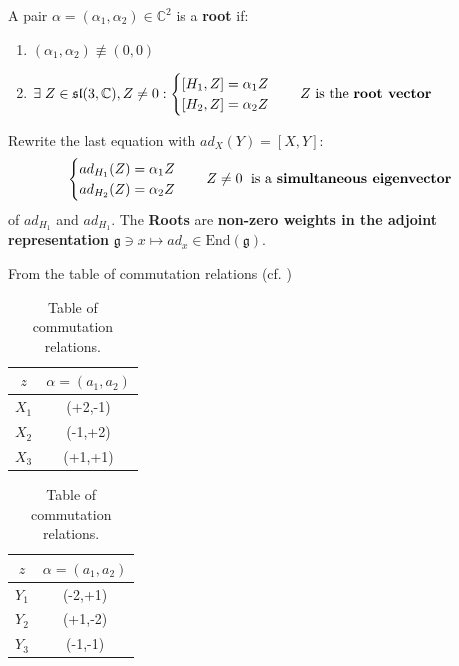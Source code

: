 \documentclass[../main.tex]{subfiles}
\begin{document}
\begin{definition}[Roots]
A pair $\alpha=(\alpha_1,\alpha_2)\in\mathbb{C}^2$ is a \textbf{root} if:
\begin{enumerate}
    \item $(\alpha_1,\alpha_2)\nequiv(0,0)$
    \item $\exists\; Z\in\mathfrak{sl}(3,\mathbb{C}), Z\neq0: \begin{cases}
    [H_1,Z]=\alpha_1 Z\\
    [H_2,Z]=\alpha_2 Z
    \end{cases}
    \quad Z \text{ is the \textbf{root vector}}$
\end{enumerate}
\end{definition}
\begin{kaobox}[frametitle=Remark]
Rewrite the last equation with $ad_X(Y)=[X,Y]$:
\[
\begin{cases}
ad_{H_1}(Z)=\alpha_1 Z\\
ad_{H_2}(Z)=\alpha_2 Z
\end{cases}
\quad Z\neq 0 \;\text{ is a \textbf{simultaneous eigenvector}}
\]
of $ad_{H_1}$ and $ad_{H_1}$. The \textbf{Roots} are \textbf{non-zero weights in the adjoint representation} $\mathfrak{g}\ni x\mapsto ad_x\in\textrm{End}(\mathfrak{g})$.
\end{kaobox}
From the table of commutation relations (cf. )
\begin{table}[h!]
    \centering
    \begin{tabular}{c|c}
       \hline
       $z$  & $\alpha=(a_1,a_2)$\\
       \hline\hline
       $X_1$ & (+2,-1)\\
       $X_2$ & (-1,+2)\\
       $X_3$ & (+1,+1)
    \end{tabular}
    \qquad 
    \begin{tabular}{c|c}
       \hline
       $z$  & $\alpha=(a_1,a_2)$\\
       \hline\hline
       $Y_1$ & (-2,+1)\\
       $Y_2$ & (+1,-2)\\
       $Y_3$ & (-1,-1)
    \end{tabular}
    \caption{Table of commutation relations.}
\end{table}
\end{document}
